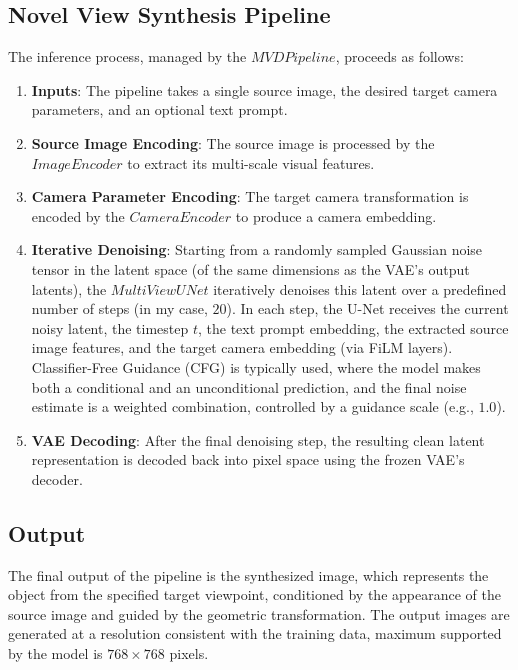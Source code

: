 \subsection{Novel View Synthesis Pipeline}
The inference process, managed by the $MVDPipeline$, proceeds as follows:
\begin{enumerate}
  \item \textbf{Inputs}: The pipeline takes a single source image, the desired target camera parameters, and an optional text prompt.
  \item \textbf{Source Image Encoding}: The source image is processed by the $ImageEncoder$ to extract its multi-scale visual features.
  \item \textbf{Camera Parameter Encoding}: The target camera transformation is encoded by the $CameraEncoder$ to produce a camera embedding.
  \item \textbf{Iterative Denoising}: Starting from a randomly sampled Gaussian noise tensor in the latent space (of the same dimensions as the VAE's output latents), the $MultiViewUNet$ iteratively denoises this latent over a predefined number of steps (in my case, $20$). In each step, the U-Net receives the current noisy latent, the timestep $t$, the text prompt embedding, the extracted source image features, and the target camera embedding (via FiLM layers). Classifier-Free Guidance (CFG) is typically used, where the model makes both a conditional and an unconditional prediction, and the final noise estimate is a weighted combination, controlled by a guidance scale (e.g., $1.0$).
  \item \textbf{VAE Decoding}: After the final denoising step, the resulting clean latent representation is decoded back into pixel space using the frozen VAE's decoder.
\end{enumerate}

\subsection{Output}
The final output of the pipeline is the synthesized image, which represents the object from the specified target viewpoint, conditioned by the appearance of the source image and guided by the geometric transformation.
The output images are generated at a resolution consistent with the training data, maximum supported by the model is $768 \times 768$ pixels.
